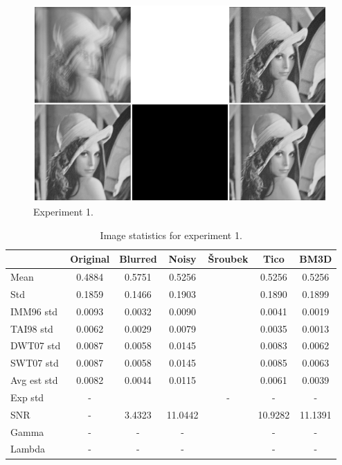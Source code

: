 \documentclass[12pt,notitlepage]{report}
\begin{document}
\begin{figure}[htb]
 \begin{center}
  \includegraphics[width=12cm]{experiment_001_complete.png}
 \end{center}
 \caption{Experiment 1.}
 \label{fig:experiment_001_complete}
\end{figure}

\begin{table}
  \begin{center}
  \begin{tabular}{ | l | c | c | c | c | c | c | }
    \hline
		& Original & Blurred & Noisy & Šroubek & Tico & BM3D \\ \hline 
	Mean & 0.4884 & 0.5751 & 0.5256 &  & 0.5256 & 0.5256 \\ \hline 
	Std & 0.1859 & 0.1466 & 0.1903 &  & 0.1890 & 0.1899 \\ \hline 
	IMM96 std & 0.0093 & 0.0032 & 0.0090 &  & 0.0041 & 0.0019 \\ \hline 
	TAI98 std  & 0.0062 & 0.0029 & 0.0079 &  & 0.0035 & 0.0013 \\ \hline 
	DWT07 std  & 0.0087 & 0.0058 & 0.0145 &  & 0.0083 & 0.0062 \\ \hline 
	SWT07 std & 0.0087 & 0.0058 & 0.0145 &  & 0.0085 & 0.0063 \\ \hline 
	Avg est std & 0.0082 & 0.0044 & 0.0115 &  & 0.0061 & 0.0039 \\ \hline 
	Exp std & - &  &  & - & - & - \\ \hline 
	SNR     & - & 3.4323 & 11.0442 &  & 10.9282 & 11.1391 \\ \hline 
	Gamma & - & - & - &  & - & - \\ \hline 
	Lambda & - & - & - &  & - & - \\ \hline 

  \end{tabular}
  \end{center}
  \caption{Image statistics for experiment 1.}
  \label{tab:experiment_001_statistics}
\end{table}
\end{document}
